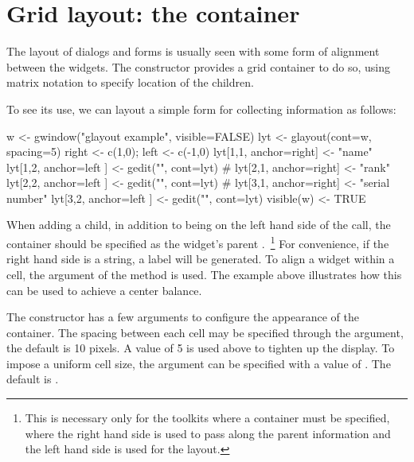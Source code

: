 


\section{Grid layout: the  container}
\label{sec:gWidgets-glayout-container}

The layout of dialogs and forms is usually seen with some form of
alignment between the widgets. The  constructor
provides a grid container to do so, using matrix notation to specify
location of the children.  

To see its use, we can layout a simple form for collecting information
as follows:

\begin{Schunk}
\begin{Sinput}
 w <- gwindow("glayout example", visible=FALSE)
 lyt <- glayout(cont=w, spacing=5)
 right <- c(1,0); left <- c(-1,0)
 lyt[1,1, anchor=right] <- "name"
 lyt[1,2, anchor=left ] <- gedit("", cont=lyt)
 #
 lyt[2,1, anchor=right] <- "rank"
 lyt[2,2, anchor=left ] <- gedit("", cont=lyt)
 #
 lyt[3,1, anchor=right] <- "serial number"
 lyt[3,2, anchor=left ] <- gedit("", cont=lyt)
 visible(w) <- TRUE
\end{Sinput}
\end{Schunk}
%

When adding a child, in addition to being on the left hand side of the
\code{[\ASSIGN} call, the  container should be specified
as the widget's parent .~\footnote{This is necessary
  only for the toolkits where a container must be specified, where the
  right hand side is used to pass along the parent information and the
  left hand side is used for the layout.} For convenience, if the
right hand side is a string, a label will be generated.  To align a
widget within a cell, the  argument of the
\code{[\ASSIGN}{glayout} method is used. The example above illustrates
how this can be used to achieve a center balance.

The constructor has a few arguments to configure the appearance of the
container. The spacing between each cell may be specified through the
 argument, the default is 10 pixels. A
value of 5 is used above to tighten up the display.
To impose a uniform cell size, the 
argument can be specified with a value of . The default is
. 

